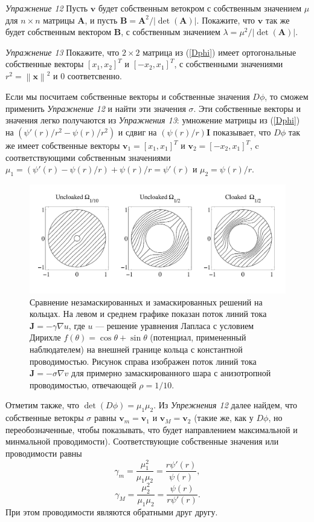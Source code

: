 \documentclass[a4paper, 12pt]{article}
\newcommand{\norm}[1]{\left\lVert#1\right\rVert}
\begin{document}
\textit{Упражнение 12} Пусть $\textbf{v}$ будет собственным ветокром с собственным
значением $\mu$ для $n \times n$ матрицы $\textbf{A}$, и пусть $\textbf{B} =
\textbf{A}^2/|\det(\textbf{A})|$. Покажите, что $\textbf{v}$ так же будет собственным 
вектором $\textbf{B}$, с собственным значением $\lambda = \mu^2/|\det(\textbf{A})|$.

\textit{Упражнение 13} Покажите, что $2 \times 2$ матрица из (\ref{Dphi}) имеет
ортогональные собственные векторы $[x_1, x_2]^T$ и $[-x_2, x_1]^T$, с собственными
значениями $r^2 = \norm{\textbf{x}}^2$ и $0$ соответсвенно.

Если мы посчитаем  собственные векторы и собственные значения $D\phi$, то сможем 
применить \textit{Упражнение 12} и найти эти значения $\sigma$. Эти собственные
векторы и значения легко получаются из \textit{Упражнения 13}: умножение матрицы
из (\ref{Dphi}) на $(\psi'(r)/r^2-\psi(r)/r^2)$ и сдвиг на $(\psi(r)/r)\textbf{I}$
показывает, что $D\phi$ так же имеет собственные векторы $\textbf{v}_1 = [x_1, x_1]^T$
и $\textbf{v}_2 = [-x_2, x_1]^T$, c соответствующими собственным значениями
$\mu_1 = (\psi'(r)-\psi(r)/r)+\psi(r)/r = \psi'(r)$ и $\mu_2 = \psi(r)/r$.
\begin{figure}[t]
  \centering
  \includegraphics[height=0.15\paperheight]{5.png}
  \caption{Сравнение незамаскированных и замаскированных решений на кольцах. На левом
  и среднем графике показан поток линий тока $\textbf{J} = -\gamma \nabla u$, 
  где $u$ ---   решение уравнения Лапласа с условием Дирихле 
  $f(\theta) = \cos \theta + \sin\theta$  (потенциал, примененный наблюдателем) на
   внешней границе кольца с константной проводимостью. Рисунок справа изображен
   поток линий тока $\textbf{J} = -\sigma \nabla v$ для примерно замаскированного
   шара с анизотропной проводимостью, отвечающей $\rho = 1/10$.}
  \label{fig:5}
\end{figure}
Отметим также, что $\det(D\phi) = \mu_1\mu_2$. Из \textit{Упрежнения 12} далее найдем,
что собственные ветокры $\sigma$ равны $\textbf{v}_m = \textbf{v}_1$ и
$\textbf{v}_{M}=\textbf{v}_2$ (такие же, как у $D\phi$, но переобозначенные, чтобы
показывать, что будет направлением максимальной и минмальной проводимости).
Соответствующие собственные значения или проводимости равны
\begin{equation*}
\gamma_m = \frac{\mu_1^2}{\mu_1\mu_2} = \frac{r\psi'(r)}{\psi(r)},
\end{equation*}
\begin{equation}
\gamma_M = \frac{\mu_2^2}{\mu_1\mu_2} = \frac{\psi(r)}{r\psi'(r)}.
\end{equation}
При этом проводимости являются обратными друг другу.
\end{document}
